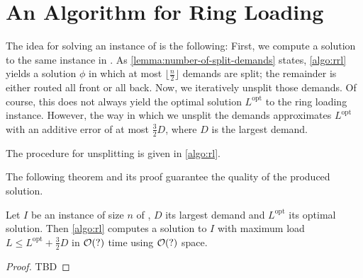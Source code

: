 \section{An Algorithm for Ring Loading}

The idea for solving an instance of \RL is the following:
First, we compute a solution to the same instance in \RRL.
As \cref{lemma:number-of-split-demands} states, \cref{algo:rrl} yields a solution $\phi$ in which at most $\lfloor\frac{n}{2}\rfloor$ demands are split; the remainder is either routed all front or all back.
Now, we iteratively unsplit those demands.
Of course, this does not always yield the optimal solution $L^\mathrm{opt}$ to the ring loading instance.
However, the way in which we unsplit the demands approximates $L^\mathrm{opt}$ with an additive error of at most $\frac{3}{2}D$, where $D$ is the largest demand.

The procedure for unsplitting is given in \cref{algo:rl}.



The following theorem and its proof guarantee the quality of the produced solution.
\begin{theorem}
	\label{theo:ring-loading-algorithm}
	Let $I$ be an instance of size $n$ of \RL, $D$ its largest demand and $L^\mathrm{opt}$ its optimal solution.
	Then \cref{algo:rl} computes a solution to $I$ with maximum load $L \leq L^\mathrm{opt} + \frac{3}{2} D$ in $\mathcal{O}(?)$ time using $\mathcal{O}(?)$ space.
\end{theorem}
\begin{proof}
	TBD
\end{proof}

